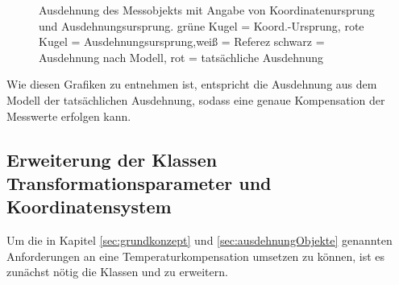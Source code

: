 \begin{figure}[H]
	\label{fig:objektausdehnungursprung}
	\centering
	\caption[Ausdehnung des Messobjekts mit Angabe von Koordinatenursprung und Ausdehnungsursprung]{Ausdehnung des Messobjekts mit Angabe von Koordinatenursprung und Ausdehnungsursprung. grüne Kugel = Koord.-Ursprung, rote Kugel = Ausdehnungsursprung,weiß = Referez schwarz = Ausdehnung nach Modell, rot = tatsächliche Ausdehnung }
\end{figure}

Wie diesen Grafiken zu entnehmen ist, entspricht die Ausdehnung aus dem Modell der tatsächlichen Ausdehnung, sodass eine genaue Kompensation der Messwerte erfolgen kann. 

\subsection{Erweiterung der Klassen Transformationsparameter und Koordinatensystem}\label{sec:klassenerweiterung}

Um die in Kapitel \ref{sec:grundkonzept} und \ref{sec:ausdehnungObjekte} genannten Anforderungen an eine Temperaturkompensation umsetzen zu können, ist es zunächst nötig die Klassen  und  zu erweitern.\\

